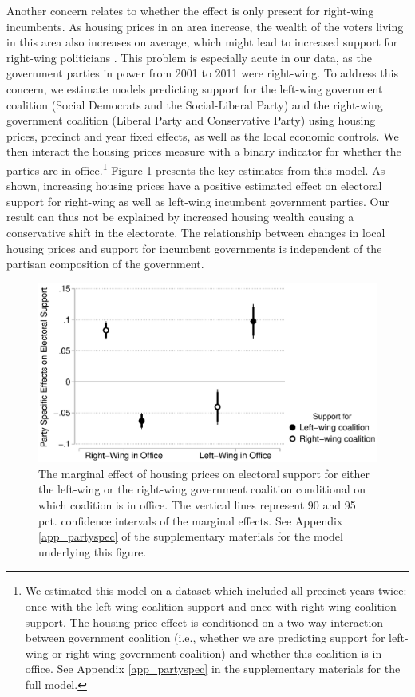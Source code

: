 \documentclass[12pt,a4paper]{article}
\begin{document}
	Another concern relates to whether the effect is only present for right-wing incumbents. As housing prices in an area increase, the wealth of the voters living in this area also increases on average, which might lead to increased support for right-wing politicians \cite{ansell2014political}. This problem is especially acute in our data, as the government parties in power from 2001 to 2011 were right-wing. To address this concern, we estimate models predicting support for the left-wing government coalition (Social Democrats and the Social-Liberal Party) and the right-wing government coalition (Liberal Party and Conservative Party) using housing prices, precinct and year fixed effects, as well as the local economic controls. We then interact the housing prices measure with a binary indicator for whether the parties are in office.\footnote{We estimated this model on a dataset which included all precinct-years twice: once with the left-wing coalition support and once with right-wing coalition support. The housing price effect is conditioned on a two-way interaction between government coalition (i.e., whether we are predicting support for left-wing or right-wing government coalition) and whether this coalition is in office. See Appendix \ref{app_partyspec} in the supplementary materials for the full model.} Figure \ref{partyspecific} presents the key estimates from this model. As shown, increasing housing prices have a positive estimated effect on electoral support for right-wing as well as left-wing incumbent government parties. Our result can thus not be explained by increased housing wealth causing a conservative shift in the electorate. The relationship between changes in local housing prices and support for incumbent governments is independent of the partisan composition of the government.
	
	\begin{figure}
		\includegraphics[width=1\textwidth]{../figures/partyspecific.eps}
		\caption{The marginal effect of housing prices on electoral support for either the left-wing or the right-wing government coalition conditional on which coalition is in office.  The vertical lines represent 90 and 95 pct. confidence intervals of the marginal effects. See Appendix \ref{app_partyspec} of the supplementary materials for the model underlying this figure.}
		\label {partyspecific}
	\end{figure}
	
\end{document}
